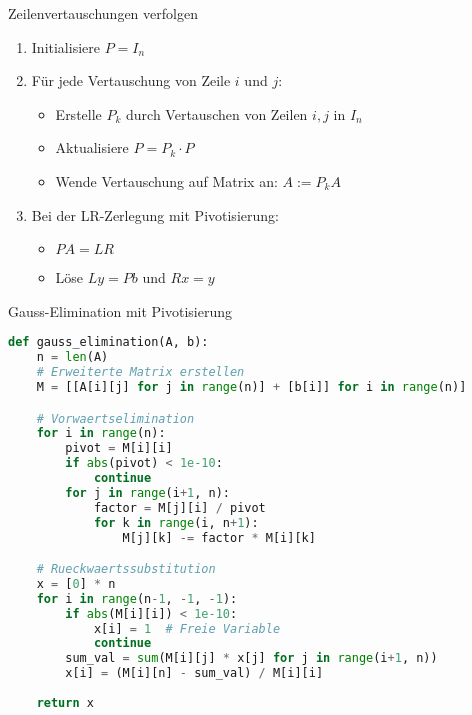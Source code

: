 \begin{KR}{Zeilenvertauschungen verfolgen}
\begin{enumerate}
    \item Initialisiere $P = I_n$
    \item Für jede Vertauschung von Zeile $i$ und $j$:
    \begin{itemize}
        \item Erstelle $P_k$ durch Vertauschen von Zeilen $i,j$ in $I_n$
        \item Aktualisiere $P = P_k \cdot P$
        \item Wende Vertauschung auf Matrix an: $A := P_kA$
    \end{itemize}
    \item Bei der LR-Zerlegung mit Pivotisierung:
    \begin{itemize}
        \item $PA = LR$ 
        \item Löse $Ly = Pb$ und $Rx = y$
    \end{itemize}
\end{enumerate}
\end{KR}

\begin{examplecode}{Gauss-Elimination mit Pivotisierung}
\begin{lstlisting}[language=Python, style=basesmol]
def gauss_elimination(A, b):
    n = len(A)
    # Erweiterte Matrix erstellen
    M = [[A[i][j] for j in range(n)] + [b[i]] for i in range(n)]

    # Vorwaertselimination
    for i in range(n):
        pivot = M[i][i]
        if abs(pivot) < 1e-10:
            continue
        for j in range(i+1, n):
            factor = M[j][i] / pivot
            for k in range(i, n+1):
                M[j][k] -= factor * M[i][k]

    # Rueckwaertssubstitution
    x = [0] * n
    for i in range(n-1, -1, -1):
        if abs(M[i][i]) < 1e-10:
            x[i] = 1  # Freie Variable
            continue
        sum_val = sum(M[i][j] * x[j] for j in range(i+1, n))
        x[i] = (M[i][n] - sum_val) / M[i][i]
    
    return x
\end{lstlisting}    
\end{examplecode}





